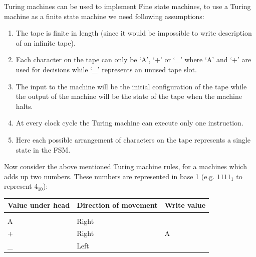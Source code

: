 \documentclass[a4paper,10pt]{article}
\theoremstyle{mytheor}
\begin{document}
{  Turing machines can be used to implement Fine state machines, to use
  a Turing machine as a finite state machine we need following
  assumptions:
  \begin{enumerate}
  \item The tape is finite in length (since it would be impossible
    to write description of an infinite tape).
  \item Each character on the tape can only be `A', `+' or `\_' where
    `A' and `+' are used for decisions while `\_' represents an unused
    tape slot.
  \item The input to the machine will be the initial configuration
    of the tape while the output of the machine will be the state of
    the tape when the machine halts.
  \item At every clock cycle the Turing machine can execute only one
    instruction.
  \item Here each possible arrangement of characters on the tape
    represents a single state in the FSM.
  \end{enumerate}

    Now consider the above mentioned Turing machine rules, for a machines
    which adds up two numbers. These numbers are represented in base 1
    (e.g. $1111_1$ to represent $4_{10}$):
    \begin{table}
      \centering
      \renewcommand{\arraystretch}{1.1}
      \begin{tabularx}{0.8\textwidth}{|X|X|X|}
        \hline
        \rowcolor{greatblue}
        \color{white} Value under head & \color{white}Direction of movement & \color{white}Write value \\
        \hline
        \vspace{0.2cm}&&\\
        A  & Right &   \\
        +  & Right & A \\
        \_ & Left &   \\
        \hline
      \end{tabularx}
    \end{table}

}
\end{document}

